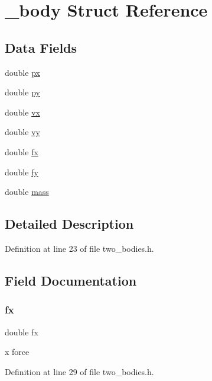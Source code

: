 \hypertarget{struct__body}{}\section{\+\_\+body Struct Reference}
\label{struct__body}
\subsection*{Data Fields}
\begin{DoxyCompactItemize}
\item 
double \hyperlink{struct__body_a9c1e50fd3234caf28c5f65a912b5c16a}{px}
\item 
double \hyperlink{struct__body_ad29ba68eddcdfabc5dd4e8e213a0f5cd}{py}
\item 
double \hyperlink{struct__body_a2d31cc80a747457c212675a58c68b2b1}{vx}
\item 
double \hyperlink{struct__body_a42e75115788e629a258d041808d822a0}{vy}
\item 
double \hyperlink{struct__body_aa7e88347476ef454086e7c3cd9865460}{fx}
\item 
double \hyperlink{struct__body_a03c4ce20c7e4b8c6d60a20b833be69fe}{fy}
\item 
double \hyperlink{struct__body_a244bf42c46054cf1113be44d55f2156d}{mass}
\end{DoxyCompactItemize}


\subsection{Detailed Description}


Definition at line 23 of file two\+\_\+bodies.\+h.



\subsection{Field Documentation}
\mbox{\label{struct__body_aa7e88347476ef454086e7c3cd9865460}} 
\subsubsection{\texorpdfstring{fx}{fx}}
{\footnotesize\ttfamily double fx}

x force 

Definition at line 29 of file two\+\_\+bodies.\+h.

